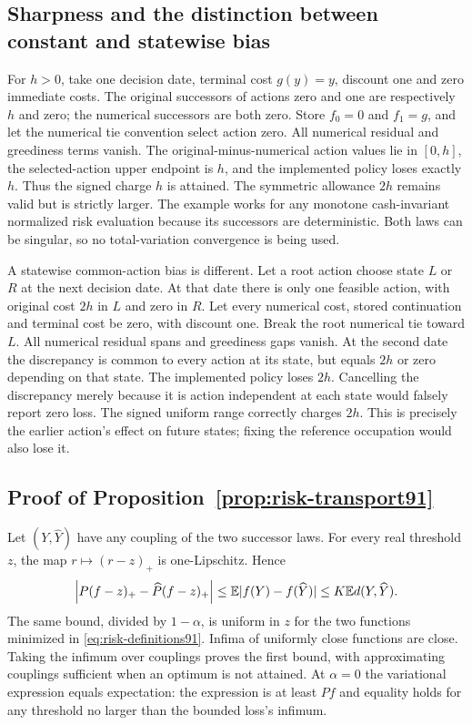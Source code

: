 \subsection{Sharpness and the distinction between constant and statewise bias}
For $h>0$, take one decision date, terminal cost $g(y)=y$, discount one and zero immediate costs. The original successors of actions zero and one are respectively $h$ and zero; the numerical successors are both zero. Store $f_0=0$ and $f_1=g$, and let the numerical tie convention select action zero. All numerical residual and greediness terms vanish. The original-minus-numerical action values lie in $[0,h]$, the selected-action upper endpoint is $h$, and the implemented policy loses exactly $h$. Thus the signed charge $h$ is attained. The symmetric allowance $2h$ remains valid but is strictly larger. The example works for any monotone cash-invariant normalized risk evaluation because its successors are deterministic. Both laws can be singular, so no total-variation convergence is being used.

A statewise common-action bias is different. Let a root action choose state $L$ or $R$ at the next decision date. At that date there is only one feasible action, with original cost $2h$ in $L$ and zero in $R$. Let every numerical cost, stored continuation and terminal cost be zero, with discount one. Break the root numerical tie toward $L$. All numerical residual spans and greediness gaps vanish. At the second date the discrepancy is common to every action at its state, but equals $2h$ or zero depending on that state. The implemented policy loses $2h$. Cancelling the discrepancy merely because it is action independent at each state would falsely report zero loss. The signed uniform range correctly charges $2h$. This is precisely the earlier action's effect on future states; fixing the reference occupation would also lose it.

\subsection{Proof of Proposition~\ref{prop:risk-transport91}}
Let $(Y,\widehat Y)$ have any coupling of the two successor laws. For every real threshold $z$, the map $r\mapsto(r-z)_+$ is one-Lipschitz. Hence
\[
 \left|P(f-z)_+-\widehat P(f-z)_+\right|
 \le \mathbb E|f(Y)-f(\widehat Y)|\le K\mathbb E d(Y,\widehat Y).
\]
The same bound, divided by $1-\alpha$, is uniform in $z$ for the two functions minimized in \eqref{eq:risk-definitions91}. Infima of uniformly close functions are close. Taking the infimum over couplings proves the first bound, with approximating couplings sufficient when an optimum is not attained. At $\alpha=0$ the variational expression equals expectation: the expression is at least $Pf$ and equality holds for any threshold no larger than the bounded loss's infimum.

